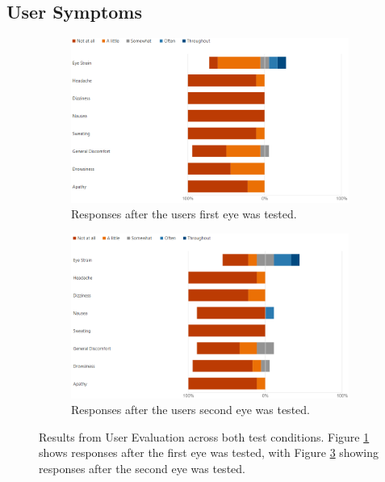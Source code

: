 \documentclass{l4proj}
\begin{document}
\begin{appendices}
\subsection{User Symptoms} \label{fig:symptoms}
\begin{figure}[htbp]
    \centering
    \begin{subfigure}{0.95\textwidth}
        \includegraphics[width=\textwidth]{dissertation/images/Symptoms_Part_1.png}
        \caption{Responses after the users first eye was tested.}
        \label{fig:symptoms_part_1}
    \end{subfigure}
    \hfill
    \begin{subfigure}{0.95\textwidth}
        \includegraphics[width=\textwidth]{dissertation/images/Symptoms_Part_2.png}
        \caption{Responses after the users second eye was tested.}
        \label{fig:symptoms_part_2}
    \end{subfigure}
    \caption{Results from User Evaluation across both test conditions. Figure \ref{fig:symptoms_part_1} shows responses after the first eye was tested, with Figure \ref{fig:symptoms_part_2} showing responses after the second eye was tested.}
\end{figure}
\newpage

\end{appendices}
\end{document}
